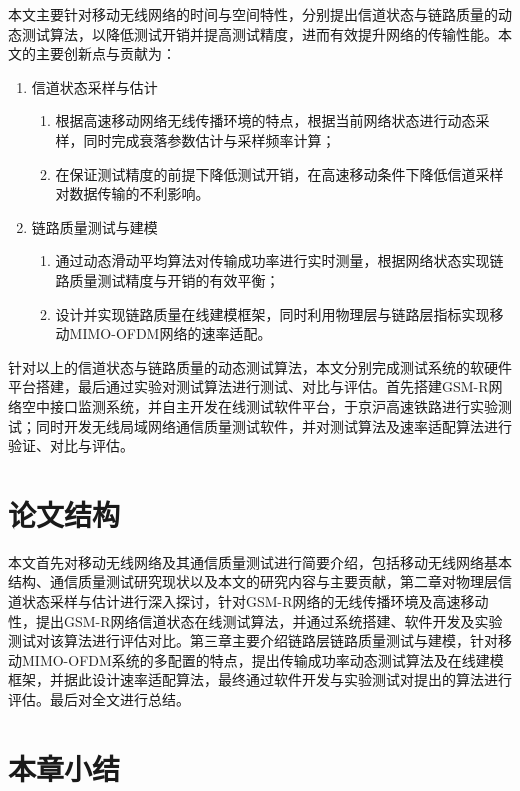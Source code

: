 本文主要针对移动无线网络的时间与空间特性，分别提出信道状态与链路质量的动态测试算法，以降低测试开销并提高测试精度，进而有效提升网络的传输性能。本文的主要创新点与贡献为：
\begin{enumerate}
\item 信道状态采样与估计
    \begin{enumerate}
      \item 根据高速移动网络无线传播环境的特点，根据当前网络状态进行动态采样，同时完成衰落参数估计与采样频率计算；
      \item 在保证测试精度的前提下降低测试开销，在高速移动条件下降低信道采样对数据传输的不利影响。
    \end{enumerate}
\item 链路质量测试与建模
    \begin{enumerate}
      \item 通过动态滑动平均算法对传输成功率进行实时测量，根据网络状态实现链路质量测试精度与开销的有效平衡；
      \item 设计并实现链路质量在线建模框架，同时利用物理层与链路层指标实现移动MIMO-OFDM网络的速率适配。
    \end{enumerate}
\end{enumerate}
针对以上的信道状态与链路质量的动态测试算法，本文分别完成测试系统的软硬件平台搭建，最后通过实验对测试算法进行测试、对比与评估。首先搭建GSM-R网络空中接口监测系统，并自主开发在线测试软件平台，于京沪高速铁路进行实验测试；同时开发无线局域网络通信质量测试软件，并对测试算法及速率适配算法进行验证、对比与评估。

\section{论文结构}

本文首先对移动无线网络及其通信质量测试进行简要介绍，包括移动无线网络基本结构、通信质量测试研究现状以及本文的研究内容与主要贡献，第二章对物理层信道状态采样与估计进行深入探讨，针对GSM-R网络的无线传播环境及高速移动性，提出GSM-R网络信道状态在线测试算法，并通过系统搭建、软件开发及实验测试对该算法进行评估对比。第三章主要介绍链路层链路质量测试与建模，针对移动MIMO-OFDM系统的多配置的特点，提出传输成功率动态测试算法及在线建模框架，并据此设计速率适配算法，最终通过软件开发与实验测试对提出的算法进行评估。最后对全文进行总结。

\section{本章小结}

